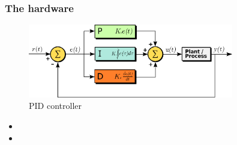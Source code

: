 \documentclass{beamer}
\begin{document}
\begin{frame}
\frametitle{The hardware} %


\begin{figure}	
	\includegraphics[width=0.8\textwidth]{Figures/PID.png}
	\caption{PID controller}
	\label{pid}
\end{figure}

\begin{itemize}
	\item

	\item 
	
\end{itemize}

\end{frame}
\end{document}

